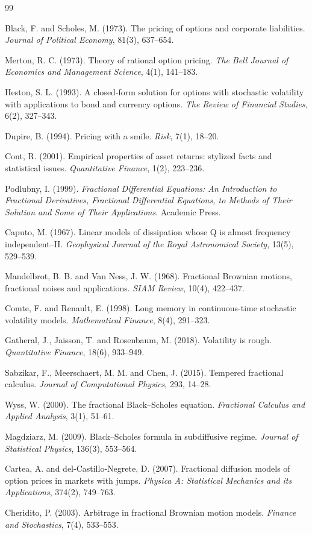\documentclass[11pt,a4paper]{report}
\begin{document}
\begin{thebibliography}{99}

Black, F. and Scholes, M. (1973).
The pricing of options and corporate liabilities.
\textit{Journal of Political Economy}, 81(3), 637--654.

Merton, R. C. (1973).
Theory of rational option pricing.
\textit{The Bell Journal of Economics and Management Science}, 4(1), 141--183.

Heston, S. L. (1993).
A closed-form solution for options with stochastic volatility with applications to bond and currency options.
\textit{The Review of Financial Studies}, 6(2), 327--343.

Dupire, B. (1994).
Pricing with a smile.
\textit{Risk}, 7(1), 18--20.

Cont, R. (2001).
Empirical properties of asset returns: stylized facts and statistical issues.
\textit{Quantitative Finance}, 1(2), 223--236.

Podlubny, I. (1999).
\textit{Fractional Differential Equations: An Introduction to Fractional Derivatives, Fractional Differential Equations, to Methods of Their Solution and Some of Their Applications}.
Academic Press.

Caputo, M. (1967).
Linear models of dissipation whose Q is almost frequency independent--II.
\textit{Geophysical Journal of the Royal Astronomical Society}, 13(5), 529--539.

Mandelbrot, B. B. and Van Ness, J. W. (1968).
Fractional Brownian motions, fractional noises and applications.
\textit{SIAM Review}, 10(4), 422--437.

Comte, F. and Renault, E. (1998).
Long memory in continuous-time stochastic volatility models.
\textit{Mathematical Finance}, 8(4), 291--323.

Gatheral, J., Jaisson, T. and Rosenbaum, M. (2018).
Volatility is rough.
\textit{Quantitative Finance}, 18(6), 933--949.

Sabzikar, F., Meerschaert, M. M. and Chen, J. (2015).
Tempered fractional calculus.
\textit{Journal of Computational Physics}, 293, 14--28.

Wyss, W. (2000).
The fractional Black--Scholes equation.
\textit{Fractional Calculus and Applied Analysis}, 3(1), 51--61.

Magdziarz, M. (2009).
Black--Scholes formula in subdiffusive regime.
\textit{Journal of Statistical Physics}, 136(3), 553--564.

Cartea, A. and del-Castillo-Negrete, D. (2007).
Fractional diffusion models of option prices in markets with jumps.
\textit{Physica A: Statistical Mechanics and its Applications}, 374(2), 749--763.


Cheridito, P. (2003).
Arbitrage in fractional Brownian motion models.
\textit{Finance and Stochastics}, 7(4), 533--553.

\end{thebibliography}
\end{document}
